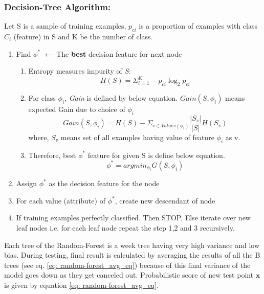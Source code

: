 \documentclass{report}
\begin{document}
\subsubsection{Decision-Tree Algorithm:}\label{subsec: Decision-Tree}
Let S is a sample of training examples,  $p_{ci}$ is a proportion of examples with class $C_i$ (feature) in S and K be the number of class.
\begin{enumerate}
    \item Find $\phi^*$ $\leftarrow$  The \textbf{best} decision feature for next node
    \begin{enumerate}
        \item Entropy measures impurity of $S$: 
            \begin{equation}
                H(S) =  \Sigma^{K}_{i=1} - p_{ci} \log_{2} p_{ci}
            \end{equation}
        \item For class $\phi_i$, \textit{Gain} is defined by below equation. $ Gain(S,\phi_i )$ means expected Gain due to choice of $\phi_i$
            \begin{equation}
                Gain(S,\phi_i ) = H(S) - \Sigma_{v \in Values(\phi_i)} \frac{|S_v|}{|S|} H(S_v)
            \end{equation}
        where, $S_v$ means set of all examples having value of feature $\phi_i$ as v.
        \item Therefore, best $\phi^*$ feature for given S is define below equation.
             \begin{equation}
                \phi^*  =  argmin_{\phi_i} G(S,\phi_i)
            \end{equation}
    \end{enumerate}
    \item Assign $\phi^*$ as the decision feature for the node
    \item For each value (attribute) of $\phi^*$, create new descendant of node
    \item If training examples perfectly classified. Then STOP, Else iterate over new leaf nodes i.e. for each leaf node repeat the step 1,2 and 3 recursively.
\end{enumerate}

Each tree of the Random-Forest is a week tree having very high variance and low bias. During testing, final result is calculated by averaging the results of all the B trees (see eq. \ref{eq: random-forest_avg_eq}) because of this final variance of the model goes down as they get canceled out. Probabilistic  score of new test point $\boldsymbol{x}$ is given by equation \ref{eq: random-forest_avg_eq}.
\end{document}
